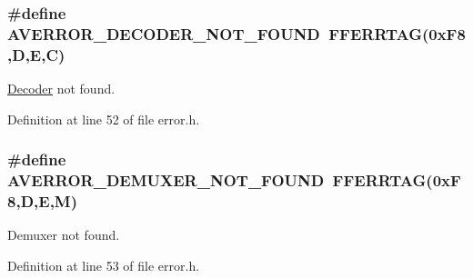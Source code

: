 \subsubsection[{\texorpdfstring{A\+V\+E\+R\+R\+O\+R\+\_\+\+D\+E\+C\+O\+D\+E\+R\+\_\+\+N\+O\+T\+\_\+\+F\+O\+U\+ND}{AVERROR_DECODER_NOT_FOUND}}]{\setlength{\rightskip}{0pt plus 5cm}\#define A\+V\+E\+R\+R\+O\+R\+\_\+\+D\+E\+C\+O\+D\+E\+R\+\_\+\+N\+O\+T\+\_\+\+F\+O\+U\+ND~{\bf F\+F\+E\+R\+R\+T\+AG}(0x\+F8,\textquotesingle{}\+D\textquotesingle{},\textquotesingle{}\+E\textquotesingle{},\textquotesingle{}\+C\textquotesingle{})}\hypertarget{group__lavu__error_ga28f845c3efcf791fdf3b2b3907330bf5}{}\label{group__lavu__error_ga28f845c3efcf791fdf3b2b3907330bf5}


\hyperlink{class_decoder}{Decoder} not found. 



Definition at line 52 of file error.\+h.

\subsubsection[{\texorpdfstring{A\+V\+E\+R\+R\+O\+R\+\_\+\+D\+E\+M\+U\+X\+E\+R\+\_\+\+N\+O\+T\+\_\+\+F\+O\+U\+ND}{AVERROR_DEMUXER_NOT_FOUND}}]{\setlength{\rightskip}{0pt plus 5cm}\#define A\+V\+E\+R\+R\+O\+R\+\_\+\+D\+E\+M\+U\+X\+E\+R\+\_\+\+N\+O\+T\+\_\+\+F\+O\+U\+ND~{\bf F\+F\+E\+R\+R\+T\+AG}(0x\+F8,\textquotesingle{}\+D\textquotesingle{},\textquotesingle{}\+E\textquotesingle{},\textquotesingle{}\+M\textquotesingle{})}\hypertarget{group__lavu__error_gaf7cbadf2ff7121084d2cde763f4e06b9}{}\label{group__lavu__error_gaf7cbadf2ff7121084d2cde763f4e06b9}


Demuxer not found. 



Definition at line 53 of file error.\+h.

